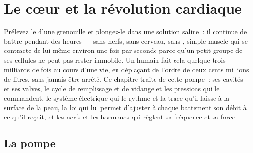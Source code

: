 \chapter{Le cœur et la révolution cardiaque}\label{ch:b2:heart}

Prélevez le  d'une grenouille et plongez-le dans une solution
saline~: il continue de battre pendant des heures --- sans nerfs, sans
cerveau, sans , simple muscle qui se contracte de lui-même environ
une fois par seconde parce qu'un petit groupe de ses cellules ne peut pas
rester immobile. Un  humain fait cela quelque trois milliards de
fois au cours d'une vie, en déplaçant de l'ordre de deux cents millions
de litres, sans jamais être arrêté. Ce chapitre traite de cette pompe~:
ses cavités et ses valves, le cycle de remplissage et de vidange et les
pressions qui le commandent, le système électrique qui le rythme et la
trace qu'il laisse à la surface de la peau, la loi qui lui permet
d'ajuster à chaque battement son débit à ce qu'il reçoit, et les nerfs
et les hormones qui règlent sa fréquence et sa force.

\section{La pompe}

